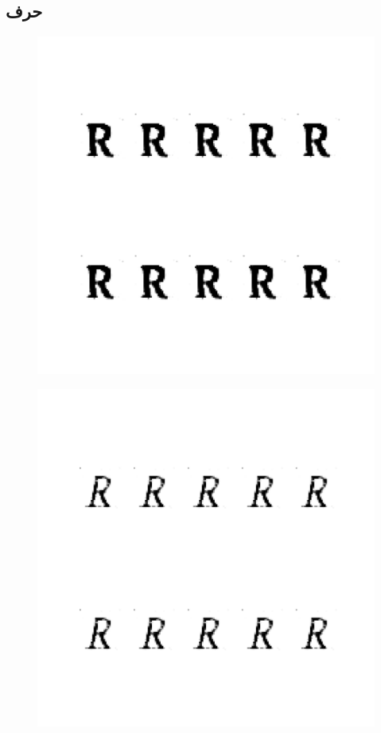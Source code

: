 \documentclass{article}
\begin{document}
\subsection{حرف }
\begin{figure}[H]
	\centerline{\includegraphics[width=\textwidth , height=\textheight ]{../results/CGAN_Adam/figs/letters/R/95.pdf}}
\end{figure}
\begin{figure}[H]
	\centerline{\includegraphics[width=\textwidth , height=\textheight ]{../results/CGAN_Adam/figs/letters/R/90.pdf}}
\end{figure}
\end{document}
